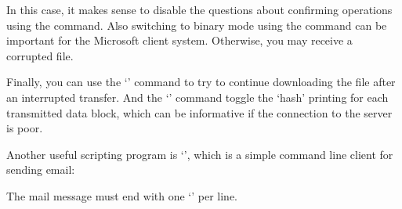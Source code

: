 In this case, it makes sense to disable the questions about confirming
operations using the  command. Also switching to binary mode using
the  command can be important for the Microsoft client system.
Otherwise, you may receive a corrupted file.

Finally, you can use the `' command to try to continue downloading
the file after an interrupted transfer. And the `' command toggle
the `hash' printing for each transmitted data block, which can be informative
if the connection to the server is poor.

Another useful scripting program is `', which is a simple command
line client for sending email:
The mail message must end with one `' per line.

